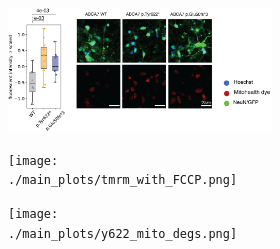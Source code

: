 \begin{figure}[ht]
\begin{subfigure}[t]{.75\textwidth}
\begin{subfigure}[t]{.25\textwidth}
        \end{subfigure}     
        \hspace{0.5cm}
        \begin{subfigure}[t]{.6\textwidth}
            \caption{}
            \includegraphics[width=\textwidth]{./extended_plots/mitohealth_dye.png}        
        \end{subfigure}     
        \par
        \begin{subfigure}[t]{.65\textwidth}
            \caption{}
            \texttt{[image: ./main\_plots/tmrm\_with\_FCCP.png]}        
        \end{subfigure}     
        \begin{subfigure}[t]{.35\textwidth}
            \caption{}
            \texttt{[image: ./main\_plots/y622\_mito\_degs.png]}        
        \end{subfigure}    
    \end{subfigure}     

\end{figure}
